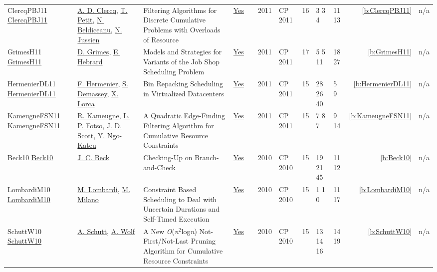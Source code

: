 {\begin{longtable}{>{\raggedright\arraybackslash}p{3cm}>{\raggedright\arraybackslash}p{4.5cm}>{\raggedright\arraybackslash}p{6.0cm}rrrp{2.5cm}rp{1cm}p{1cm}rr}
ClercqPBJ11 \href{https://doi.org/10.1007/978-3-642-23786-7_20}{ClercqPBJ11} & \hyperref[auth:a246]{A. D. Clercq}, \hyperref[auth:a221]{T. Petit}, \hyperref[auth:a128]{N. Beldiceanu}, \hyperref[auth:a247]{N. Jussien} & Filtering Algorithms for Discrete Cumulative Problems with Overloads of Resource & \href{../works/ClercqPBJ11.pdf}{Yes} & \cite{ClercqPBJ11} & 2011 & CP 2011 & 16 & 3 3 4 & 11 13 & \ref{b:ClercqPBJ11} & n/a\\
GrimesH11 \href{https://doi.org/10.1007/978-3-642-23786-7_28}{GrimesH11} & \hyperref[auth:a181]{D. Grimes}, \hyperref[auth:a1]{E. Hebrard} & \cellcolor{green!10}Models and Strategies for Variants of the Job Shop Scheduling Problem & \href{../works/GrimesH11.pdf}{Yes} & \cite{GrimesH11} & 2011 & CP 2011 & 17 & 5 5 11 & 18 27 & \ref{b:GrimesH11} & n/a\\
HermenierDL11 \href{https://doi.org/10.1007/978-3-642-23786-7_5}{HermenierDL11} & \hyperref[auth:a242]{F. Hermenier}, \hyperref[auth:a243]{S. Demassey}, \hyperref[auth:a244]{X. Lorca} & Bin Repacking Scheduling in Virtualized Datacenters & \href{../works/HermenierDL11.pdf}{Yes} & \cite{HermenierDL11} & 2011 & CP 2011 & 15 & 28 26 40 & 5 9 & \ref{b:HermenierDL11} & n/a\\
KameugneFSN11 \href{https://doi.org/10.1007/978-3-642-23786-7_37}{KameugneFSN11} & \hyperref[auth:a10]{R. Kameugne}, \hyperref[auth:a130]{L. P. Fotso}, \hyperref[auth:a131]{J. D. Scott}, \hyperref[auth:a132]{Y. Ngo-Kateu} & A Quadratic Edge-Finding Filtering Algorithm for Cumulative Resource Constraints & \href{../works/KameugneFSN11.pdf}{Yes} & \cite{KameugneFSN11} & 2011 & CP 2011 & 15 & 7 8 7 & 9 14 & \ref{b:KameugneFSN11} & n/a\\
Beck10 \href{https://doi.org/10.1007/978-3-642-15396-9_10}{Beck10} & \hyperref[auth:a89]{J. C. Beck} & \cellcolor{green!10}Checking-Up on Branch-and-Check & \href{../works/Beck10.pdf}{Yes} & \cite{Beck10} & 2010 & CP 2010 & 15 & 19 21 45 & 11 12 & \ref{b:Beck10} & n/a\\
LombardiM10 \href{https://doi.org/10.1007/978-3-642-15396-9_32}{LombardiM10} & \hyperref[auth:a142]{M. Lombardi}, \hyperref[auth:a143]{M. Milano} & Constraint Based Scheduling to Deal with Uncertain Durations and Self-Timed Execution & \href{../works/LombardiM10.pdf}{Yes} & \cite{LombardiM10} & 2010 & CP 2010 & 15 & 1 1 0 & 11 17 & \ref{b:LombardiM10} & n/a\\
SchuttW10 \href{https://doi.org/10.1007/978-3-642-15396-9_36}{SchuttW10} & \hyperref[auth:a124]{A. Schutt}, \hyperref[auth:a51]{A. Wolf} & A New \emph{O}(\emph{n}\({}^{\mbox{2}}\)log\emph{n}) Not-First/Not-Last Pruning Algorithm for Cumulative Resource Constraints & \href{../works/SchuttW10.pdf}{Yes} & \cite{SchuttW10} & 2010 & CP 2010 & 15 & 13 14 16 & 14 19 & \ref{b:SchuttW10} & n/a\\

\end{longtable}}

